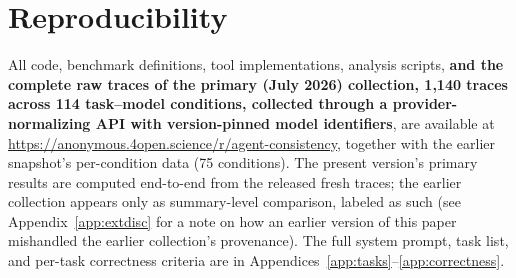 \documentclass[11pt]{article}
\begin{document}
\section*{Reproducibility}
All code, benchmark definitions, tool implementations, analysis scripts,
\textbf{and the complete raw traces of the primary (July 2026) collection,
1{,}140 traces across 114 task--model conditions, collected through a
provider-normalizing API with version-pinned model identifiers}, are
available at \url{https://anonymous.4open.science/r/agent-consistency}, together
with the earlier snapshot's per-condition data (75 conditions). The present
version's primary results are computed end-to-end from the released fresh
traces; the earlier collection appears only as summary-level comparison,
labeled as such (see Appendix~\ref{app:extdisc} for a note on how an earlier
version of this paper mishandled the earlier collection's provenance). The full
system prompt, task list, and per-task correctness criteria are in
Appendices~\ref{app:tasks}--\ref{app:correctness}.
\end{document}
